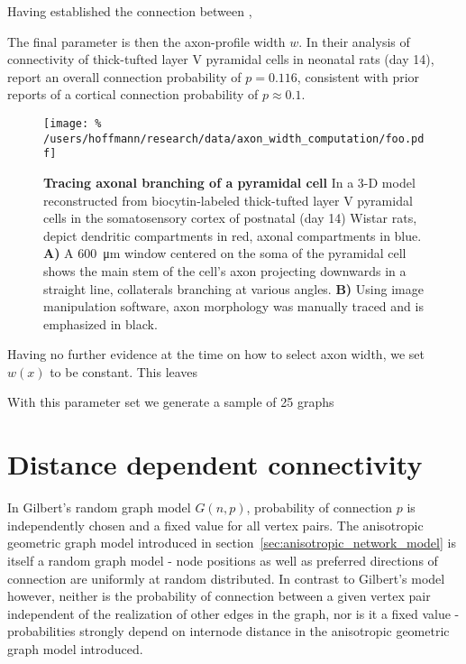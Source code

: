 Having established the connection between , 


The final parameter is then the axon-profile width $w$. In their
analysis of connectivity of thick-tufted layer V pyramidal cells in
neonatal rats (day 14), \textcite{Song2005} report an overall connection
probability of $p=0.116$, consistent with prior reports of a cortical
connection probability of $p \approx 0.1$. %

\begin{figure}[!htbp]
  \centering
  \texttt{[image: \%
    /users/hoffmann/research/data/axon\_width\_computation/foo.pdf]}%
  \caption{\textbf{Tracing axonal branching of a pyramidal cell} In a
    3-D model reconstructed from biocytin-labeled thick-tufted layer V
    pyramidal cells in the somatosensory cortex of postnatal (day 14)
    Wistar rats, \textcite{Romand2011} depict dendritic compartments in
    red, axonal compartments in blue.  \textbf{A)} A
    \SI{600}{\micro\meter} window centered on the soma of the pyramidal
    cell shows the main stem of the cell's axon projecting downwards in a
    straight line, collaterals branching at various angles. \textbf{B)}
    Using image manipulation software, axon morphology was manually traced
    and is emphasized in black.} %
  \label{fig:determine_axon_width}%
\end{figure}


Having no further evidence at the time on how to select axon width, we
set $w(x)$ to be constant. This leaves 



With this parameter set we generate a sample of 25 graphs %






\clearpage
\newpage
\section{Distance dependent connectivity}\label{sec:distance_connectivity}

In Gilbert's random graph model $G(n,p)$,
probability of connection $p$ is independently chosen and a fixed
value for all vertex pairs. The anisotropic geometric graph model
introduced in section~\ref{sec:anisotropic_network_model} is itself a
random graph model - node positions as well as preferred directions of
connection are uniformly at random distributed. In contrast to
Gilbert's model however, neither is the probability of connection
between a given vertex pair independent of the realization of other
edges in the graph, nor is it a fixed value - probabilities strongly
depend on internode distance in the anisotropic geometric graph model
introduced.

